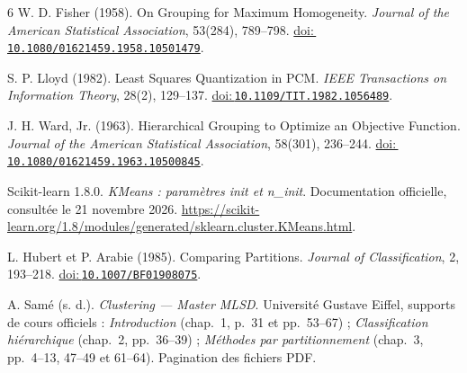 ﻿\begingroup
{}
{}
\small
\setlength{\parskip}{0pt}
\begin{thebibliography}{6}
\setlength{\itemsep}{0.3em}
W. D. Fisher (1958).
On Grouping for Maximum Homogeneity.
\emph{Journal of the American Statistical Association}, 53(284), 789--798.
\href{https://doi.org/10.1080/01621459.1958.10501479}{doi:\,\nolinkurl{10.1080/01621459.1958.10501479}}.

S. P. Lloyd (1982).
Least Squares Quantization in PCM.
\emph{IEEE Transactions on Information Theory}, 28(2), 129--137.
\href{https://doi.org/10.1109/TIT.1982.1056489}{doi:\,\nolinkurl{10.1109/TIT.1982.1056489}}.

J. H. Ward, Jr. (1963).
Hierarchical Grouping to Optimize an Objective Function.
\emph{Journal of the American Statistical Association}, 58(301), 236--244.
\href{https://doi.org/10.1080/01621459.1963.10500845}{doi:\,\nolinkurl{10.1080/01621459.1963.10500845}}.

Scikit-learn 1.8.0.
\emph{KMeans : paramètres init et n\_init}.
Documentation officielle, consultée le 21 novembre 2026.
\url{https://scikit-learn.org/1.8/modules/generated/sklearn.cluster.KMeans.html}.

L. Hubert et P. Arabie (1985).
Comparing Partitions.
\emph{Journal of Classification}, 2, 193--218.
\href{https://doi.org/10.1007/BF01908075}{doi:\,\nolinkurl{10.1007/BF01908075}}.

A. Samé (s. d.).
\emph{Clustering — Master MLSD}.
Université Gustave Eiffel, supports de cours officiels :
\emph{Introduction} (chap.~1, p.~31 et pp.~53--67) ;
\emph{Classification hiérarchique} (chap.~2, pp.~36--39) ;
\emph{Méthodes par partitionnement} (chap.~3, pp.~4--13, 47--49 et 61--64).
Pagination des fichiers PDF.
\end{thebibliography}
\endgroup
